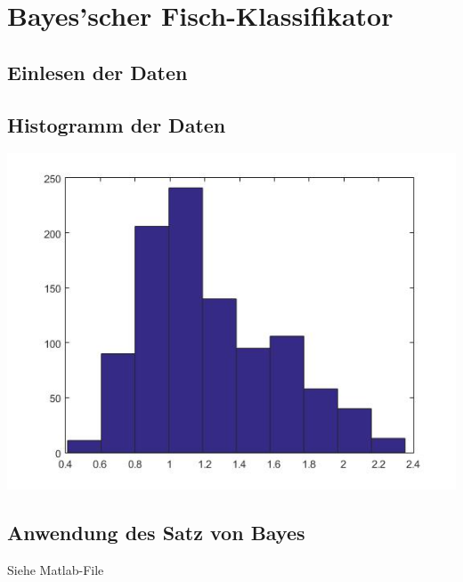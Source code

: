 \documentclass{scrartcl}
\begin{document}
\section{Bayes'scher Fisch-Klassifikator}

\subsection{Einlesen der Daten} 
\subsection{Histogramm der Daten}
\includegraphics[width=.6\textwidth]{plots/2b_hist.jpg}

\subsection{Anwendung des Satz von Bayes}
Siehe Matlab-File
\end{document}

